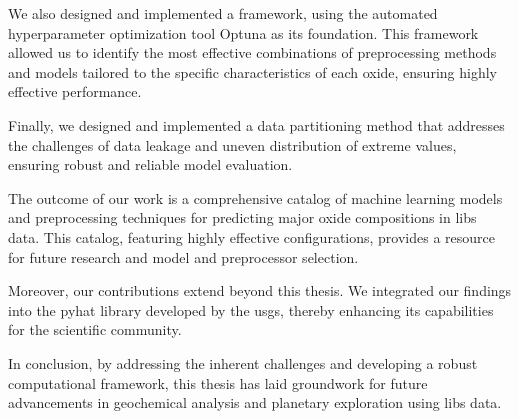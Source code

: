 We also designed and implemented a framework, using the automated hyperparameter optimization tool Optuna as its foundation.
This framework allowed us to identify the most effective combinations of preprocessing methods and models tailored to the specific characteristics of each oxide, ensuring highly effective performance.

Finally, we designed and implemented a data partitioning method that addresses the challenges of data leakage and uneven distribution of extreme values, ensuring robust and reliable model evaluation.

The outcome of our work is a comprehensive catalog of machine learning models and preprocessing techniques for predicting major oxide compositions in \gls{libs} data.
This catalog, featuring highly effective configurations, provides a resource for future research and model and preprocessor selection.

Moreover, our contributions extend beyond this thesis.
We integrated our findings into the \gls{pyhat} library developed by the \gls{usgs}, thereby enhancing its capabilities for the scientific community.

In conclusion, by addressing the inherent challenges and developing a robust computational framework, this thesis has laid groundwork for future advancements in geochemical analysis and planetary exploration using \gls{libs} data.
